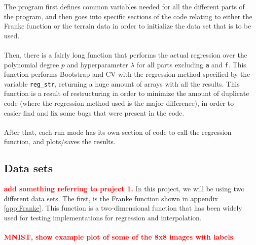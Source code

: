 \documentclass[a4paper]{article}
\newcommand\red[1]{\textcolor{red}{\textbf{#1}}}
\begin{document}
The program first defines common variables needed for all the different parts of the program, and then goes into specific sections of the code relating to either the Franke function or the terrain data in order to initialize the data set that is to be used.
\\\\
Then, there is a fairly long function that performs the actual regression over the polynomial degree $p$ and hyperparameter $\lambda$ for all parts excluding \texttt{a} and \texttt{f}. This function performs Bootstrap and CV with the regression method specified by the variable \texttt{reg\_str}, returning a huge amount of arrays with all the results. This function is a result of restructuring in order to minimize the amount of duplicate code (where the regression method used is the major difference), in order to easier find and fix some bugs that were present in the code.
\\\\
After that, each run mode has its own section of code to call the regression function, and plots/saves the results.

\subsection{Data sets} \label{sec:data_sets}
\red{add something referring to project 1.} In this project, we will be using two different data sets. The first, is the Franke function shown in appendix \ref{app:Franke}. This function is a two-dimensional function that has been widely used for testing implementations for regression and interpolation.
\\\\
%
\red{MNIST, show example plot of some of the 8x8 images with labels}
\end{document}
